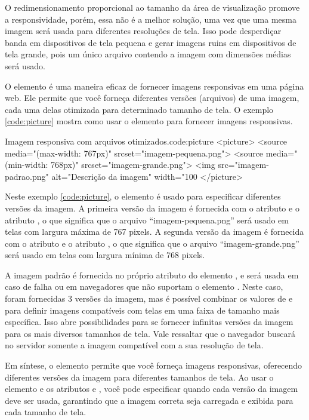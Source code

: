 O redimensionamento proporcional ao tamanho da área de visualização promove a responsividade, porém, essa não é a melhor solução, uma vez que uma mesma imagem será usada para diferentes resoluções de tela. Isso pode desperdiçar banda em dispositivos de tela pequena e gerar imagens ruins em dispositivos de tela grande, pois um único arquivo contendo a imagem com dimensões médias será usado.

O elemento  é uma maneira eficaz de fornecer imagens responsivas em uma página web. Ele permite que você forneça diferentes versões (arquivos) de uma imagem, cada uma delas otimizada para determinado tamanho de tela. O exemplo \ref{code:picture} mostra como usar o elemento  para fornecer imagens responsivas.

\begin{htmlcode}{Imagem responsiva com arquivos otimizados.}{code:picture}
<picture>
    <source media="(max-width: 767px)" srcset="imagem-pequena.png">
    <source media="(min-width: 768px)" srcset="imagem-grande.png">
    <img src="imagem-padrao.png" alt="Descrição da imagem" width="100%
</picture>
\end{htmlcode}

Neste exemplo \ref{code:picture}, o elemento  é usado para especificar diferentes versões da imagem. A primeira versão da imagem é fornecida com o atributo  e o atributo , o que significa que o arquivo ``imagem-pequena.png'' será usado em telas com largura máxima de 767 pixels. A segunda versão da imagem é fornecida com o atributo  e o atributo , o que significa que o arquivo ``imagem-grande.png'' será usado em telas com largura mínima de 768 pixels.

A imagem padrão é fornecida no próprio atributo  do elemento , e será usada em caso de falha ou em navegadores que não suportam o elemento . Neste caso, foram fornecidas 3 versões da imagem, mas é possível combinar os valores de  e  para definir imagens compatíveis com telas em uma faixa de tamanho mais específica. Isso abre possibilidades para se fornecer infinitas versões da imagem para os mais diversos tamanhos de tela. Vale ressaltar que o navegador buscará no servidor somente a imagem compatível com a sua resolução de tela.

Em síntese, o elemento  permite que você forneça imagens responsivas, oferecendo diferentes versões da imagem para diferentes tamanhos de tela. Ao usar o elemento  e os atributos  e , você pode especificar quando cada versão da imagem deve ser usada, garantindo que a imagem correta seja carregada e exibida para cada tamanho de tela.

